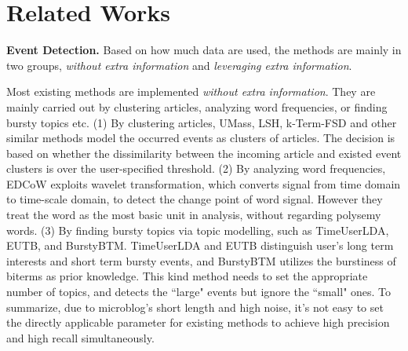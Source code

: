 \documentclass[runningheads,a4paper]{llncs}
\theoremstyle{exampstyle}
\begin{document}
\section{Related Works}
\label{sec:relatedWorks}
\textbf{Event Detection.} Based on how much data are used, the methods are mainly in two groups,  \textit{without extra information} and \textit{leveraging extra information}. 

Most existing methods are implemented \textit{without extra information}.
They are mainly carried out by clustering articles\cite{Allan:2000wu,Petrovic:2010uj,Wurzer:2015wq}, analyzing word frequencies\cite{Mathioudakis:2010fc,Weng:2011wz}, or finding bursty topics\cite{Diao:2012wj,Yan:2015wm} etc. 
(1) By clustering articles, UMass\cite{Allan:2000wu}, LSH\cite{Petrovic:2010uj}, k-Term-FSD\cite{Wurzer:2015wq} and other similar methods model the occurred events as clusters of articles.
The decision is based on whether the dissimilarity between the incoming article and existed event clusters is over the user-specified threshold. 
(2) By analyzing word frequencies, EDCoW\cite{Weng:2011wz} exploits wavelet transformation, which converts signal from time domain to time-scale domain, to detect the change point of word signal. 
However they treat the word as the most basic unit in analysis, without regarding polysemy words.
(3) By finding bursty topics via topic modelling, such as TimeUserLDA\cite{Diao:2012wj}, EUTB\cite{Yin2013A}, and BurstyBTM\cite{Yan:2015wm}.
TimeUserLDA and EUTB distinguish user's long term interests and short term bursty events, and BurstyBTM utilizes the burstiness of biterms as prior knowledge.
This kind method needs to set the appropriate number of topics, and detects the ``large" events but ignore the ``small" ones. 
To summarize, due to microblog's short length and high noise, it's not easy to set the directly applicable parameter for existing methods to achieve high precision and high recall simultaneously.
\end{document}
